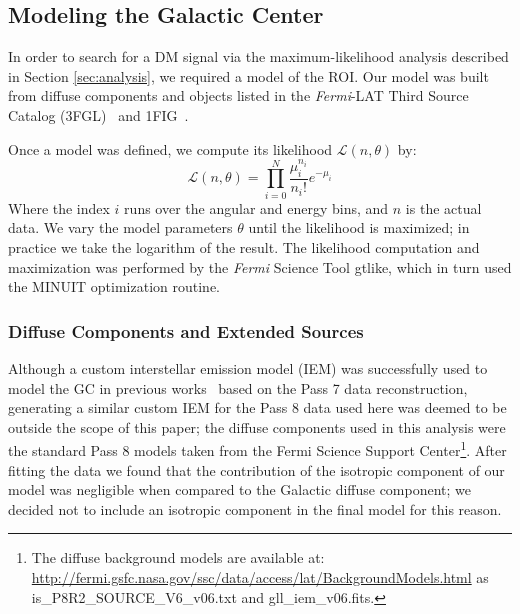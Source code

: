 \subsection{Modeling the Galactic Center}\label{sec:model_GC}

In order to search for a DM signal via the maximum-likelihood analysis described in Section \ref{sec:analysis}, we required a model of the ROI.
Our model was built from diffuse components and objects listed in the \textit{Fermi}-LAT Third Source Catalog (3FGL)~\cite{REF:2015.3FGL} and 1FIG~\cite{GC2016}. 

Once a model was defined, we compute its likelihood $\mathcal{L}(n,\theta)$ by:
\begin{equation}
\label{eq:likelihood}
\mathcal{L}(n, \theta) = \prod_{i=0}^{N}\frac{\mu_i^{n_i}}{n_i!}e^{-\mu_i}
\end{equation}
Where the index $i$ runs over the angular and energy bins, and $n$ is the actual data. 
We vary the model parameters $\theta$ until the likelihood is maximized; in practice we take the logarithm of the result. 
The likelihood computation and maximization was performed by the {\it Fermi} Science Tool \textup{gtlike}, which in turn used the MINUIT \cite{MINUIT} optimization routine.

\subsubsection{Diffuse Components and Extended Sources}\label{sec:diffuse}
Although a custom interstellar emission model (IEM) was successfully used to model the GC in previous works~\cite{GC2016} based on the Pass 7 data reconstruction, generating a similar custom IEM for the Pass 8 data used here was deemed to be outside the scope of this paper; the diffuse components used in this analysis were the standard Pass 8 models taken from the Fermi Science Support Center\footnote{The diffuse background models are available at: \url{http://fermi.gsfc.nasa.gov/ssc/data/access/lat/BackgroundModels.html} as {is\_P8R2\_SOURCE\_V6\_v06.txt} and {gll\_iem\_v06.fits}.}.
After fitting the data we found that the contribution of the isotropic component of our model was negligible when compared to the Galactic diffuse component; we decided not to include an isotropic component in the final model for this reason.

